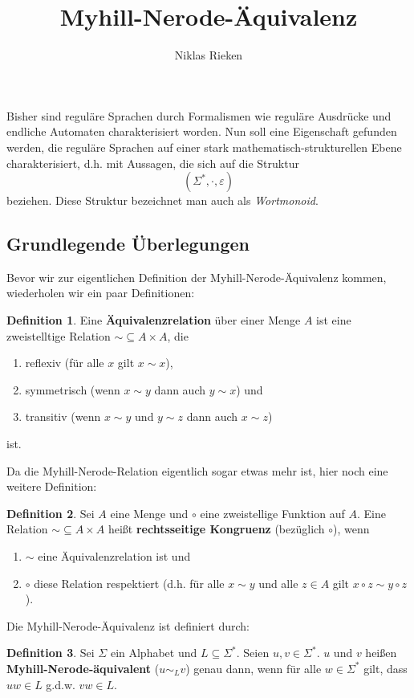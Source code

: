 \documentclass[11pt, a4paper]{article}
\author{Niklas Rieken}
\title{Myhill-Nerode-Äquivalenz}
\theoremstyle{definition}
\newtheorem{definition}{Definition}
\theoremstyle{plain}
\begin{document}
\maketitle

Bisher sind reguläre Sprachen durch Formalismen wie reguläre Ausdrücke und endliche Automaten charakterisiert worden. Nun soll eine Eigenschaft gefunden werden, die reguläre Sprachen auf einer stark mathematisch-struk\-tur\-ellen Ebene charakterisiert, d.h. mit Aussagen, die sich auf die Struktur
\[
	(\Sigma^\ast, \cdot, \varepsilon)
\]
beziehen. Diese Struktur bezeichnet man auch als \textit{Wortmonoid}.

\subsection*{Grundlegende Überlegungen}
Bevor wir zur eigentlichen Definition der Myhill-Nerode-Äquivalenz kommen, wiederholen wir ein paar Definitionen:
\begin{definition}
	Eine \textbf{Äquivalenzrelation} über einer Menge \( A \) ist eine zweistelltige Relation \( \sim \subseteq A \times A \), die 
	\begin{enumerate}
		\item reflexiv (für alle \( x \) gilt \( x \sim x \)),
		\item symmetrisch (wenn \( x \sim y \) dann auch \( y \sim  x \)) und
		\item transitiv (wenn \( x \sim y \) und \( y \sim z \) dann auch \( x \sim z \)) 
	\end{enumerate}
	ist.
\end{definition}

Da die Myhill-Nerode-Relation eigentlich sogar etwas mehr ist, hier noch eine weitere Definition:
\begin{definition}
	Sei \( A \) eine Menge und \( \circ \) eine zweistellige Funktion auf \( A \). Eine Relation \( \sim \subseteq A \times A \) heißt \textbf{rechtsseitige Kongruenz} (bezüglich \( \circ \)), wenn
	\begin{enumerate}
		\item \( \sim \) eine Äquivalenzrelation ist und
		\item \( \circ \) diese Relation respektiert (d.h. für alle \( x \sim y \) und alle \( z \in A \) gilt \( x \circ z \sim y \circ z \)).
	\end{enumerate}
\end{definition}

Die Myhill-Nerode-Äquivalenz ist definiert durch:
\begin{definition}
	Sei \( \Sigma \) ein Alphabet und \( L \subseteq \Sigma^\ast \). Seien \( u, v \in \Sigma^\ast \). \( u \) und \( v \) heißen \textbf{Myhill-Nerode-äquivalent} (\( u \sim_L v \)) genau dann, wenn für alle \( w \in \Sigma^\ast \) gilt, dass \( uw \in L \) g.d.w. \( vw \in L \).
\end{definition}
\end{document}
